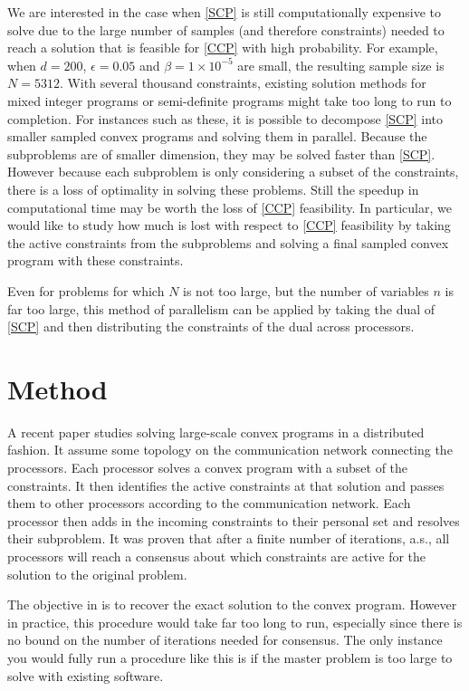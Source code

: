 \documentclass[12pt]{article}
\begin{document}
We are interested in the case when \ref{SCP} is still computationally expensive to solve due to the large number of samples (and therefore constraints) needed to reach a solution that is feasible for \ref{CCP} with high probability.
For example, when $d = 200$, $\epsilon = 0.05$ and $\beta = 1 \times 10^{-5}$ are small, the resulting sample size is $N = 5312$.
With several thousand constraints, existing solution methods for mixed integer programs or semi-definite programs might take too long to run to completion.
For instances such as these, it is possible to decompose \ref{SCP} into smaller sampled convex programs and solving them in parallel.
Because the subproblems are of smaller dimension, they may be solved faster than \ref{SCP}.
However because each subproblem is only considering a subset of the constraints, there is a loss of optimality in solving these problems.
Still the speedup in computational time may be worth the loss of \ref{CCP} feasibility.
In particular, we would like to study how much is lost with respect to \ref{CCP} feasibility by taking the active constraints from the subproblems and solving a final sampled convex program with these constraints.

Even for problems for which $N$ is not too large, but the number of variables $n$ is far too large, this method of parallelism can be applied by taking the dual of \ref{SCP} and then distributing the constraints of the dual across processors.

\section*{Method}

A recent paper \cite{carlone2014} studies solving large-scale convex programs in a distributed fashion.
It assume some topology on the communication network connecting the processors.
Each processor solves a convex program with a subset of the constraints.
It then identifies the active constraints at that solution and passes them to other processors according to the communication network.
Each processor then adds in the incoming constraints to their personal set and resolves their subproblem.
It was proven that after a finite number of iterations, a.s., all processors will reach a consensus about which constraints are active for the solution to the original problem.

The objective in \cite{carlone2014} is to recover the exact solution to the convex program.
However in practice, this procedure would take far too long to run, especially since there is no bound on the number of iterations needed for consensus.
The only instance you would fully run a procedure like this is if the master problem is too large to solve with existing software.
\end{document}
